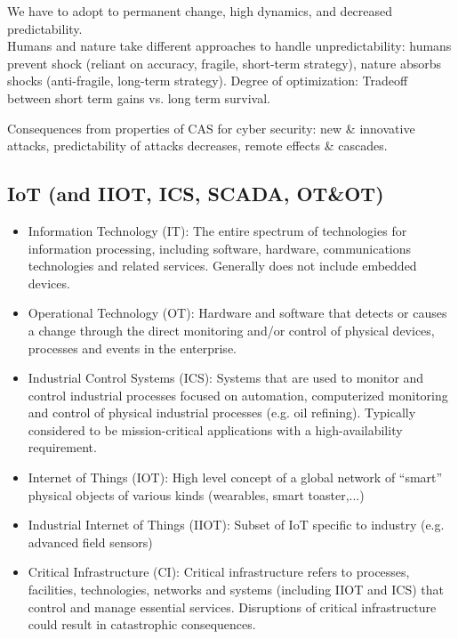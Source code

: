 \documentclass[11pt,oneside,a4paper]{article}
\begin{document}
We have to adopt to permanent change, high dynamics, and decreased predictability.\\

Humans and nature take different approaches to handle unpredictability: humans prevent shock (reliant on accuracy, fragile, short-term strategy), nature absorbs shocks (anti-fragile, long-term strategy). Degree of optimization: Tradeoff between short term gains vs. long term survival.

Consequences from properties of CAS for cyber security: new \& innovative attacks, predictability of attacks decreases, remote effects \& cascades.

\subsection{IoT (and IIOT, ICS, SCADA, OT\&OT)}

\vspace{-\topsep}
\begin{itemize}
	\setlength{\itemsep}{0pt}
	\setlength{\parskip}{0pt}
	\item Information Technology (IT): The entire spectrum of technologies for information processing, including software, hardware, communications technologies and related services. Generally does not include embedded devices.
	\item Operational Technology (OT): Hardware and software that detects or causes a change through the direct monitoring and/or control of physical devices, processes and events in the
	enterprise.
	\item Industrial Control Systems (ICS): Systems that are used to monitor and control industrial processes focused on automation, computerized monitoring and control of physical industrial processes (e.g. oil refining). Typically considered to be mission-critical applications with a high-availability requirement.
	\item Internet of Things (IOT): High level concept of a global network of “smart” physical objects of various kinds (wearables, smart toaster,...)\
	\item Industrial Internet of Things (IIOT): Subset of IoT specific to industry (e.g. advanced field sensors)
	\item Critical Infrastructure (CI): Critical infrastructure refers to processes, facilities, technologies, networks and systems (including IIOT and ICS) that control and manage essential services. Disruptions of critical infrastructure could result in catastrophic consequences.
\end{itemize}
\vspace{-\topsep}
\end{document}
